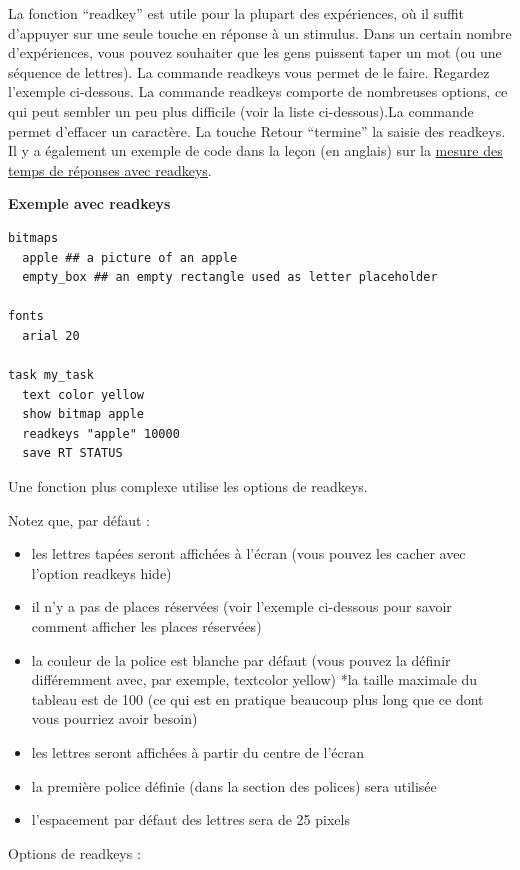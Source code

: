 \documentclass[
]{book}
\providecommand{\tightlist}{%
  \setlength{\itemsep}{0pt}\setlength{\parskip}{0pt}}
\begin{document}
La fonction ``readkey'' est utile pour la plupart des expériences, où il
suffit d'appuyer sur une seule touche en réponse à un stimulus. Dans un
certain nombre d'expériences, vous pouvez souhaiter que les gens
puissent taper un mot (ou une séquence de lettres). La commande readkeys
vous permet de le faire. Regardez l'exemple ci-dessous. La commande
readkeys comporte de nombreuses options, ce qui peut sembler un peu plus
difficile (voir la liste ci-dessous).La commande permet d'effacer un
caractère. La touche Retour ``termine'' la saisie des readkeys. Il y a
également un exemple de code dans la leçon (en anglais) sur la
\href{https://www.psytoolkit.org/lessons/readkeys.html}{mesure des temps
de réponses avec readkeys}.

\textbf{Exemple avec readkeys}

\begin{verbatim}
bitmaps
  apple ## a picture of an apple
  empty_box ## an empty rectangle used as letter placeholder

fonts
  arial 20

task my_task
  text color yellow
  show bitmap apple
  readkeys "apple" 10000
  save RT STATUS
\end{verbatim}

Une fonction plus complexe utilise les options de readkeys.

Notez que, par défaut :

\begin{itemize}
\tightlist
\item
  les lettres tapées seront affichées à l'écran (vous pouvez les cacher
  avec l'option readkeys hide)
\item
  il n'y a pas de places réservées (voir l'exemple ci-dessous pour
  savoir comment afficher les places réservées)
\item
  la couleur de la police est blanche par défaut (vous pouvez la définir
  différemment avec, par exemple, textcolor yellow) *la taille maximale
  du tableau est de 100 (ce qui est en pratique beaucoup plus long que
  ce dont vous pourriez avoir besoin)
\item
  les lettres seront affichées à partir du centre de l'écran
\item
  la première police définie (dans la section des polices) sera utilisée
\item
  l'espacement par défaut des lettres sera de 25 pixels
\end{itemize}

Options de readkeys :
\end{document}
